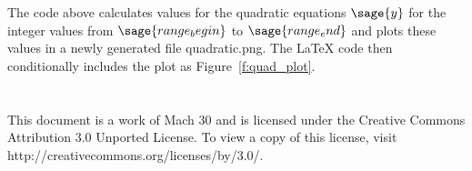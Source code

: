 \documentclass{article}
\begin{document}
The code above calculates values for the quadratic equations $\sage{y}$ for the integer values from $\sage{range_begin}$ to $\sage{range_end}$ and plots these values in a newly generated file quadratic.png.  The LaTeX code then conditionally includes the plot as Figure~\ref{f:quad_plot}.


\section*{}
This document is a work of Mach 30 and is licensed under the Creative Commons Attribution 3.0 Unported License. To view a copy of this license, visit http://creativecommons.org/licenses/by/3.0/.
\end{document}
